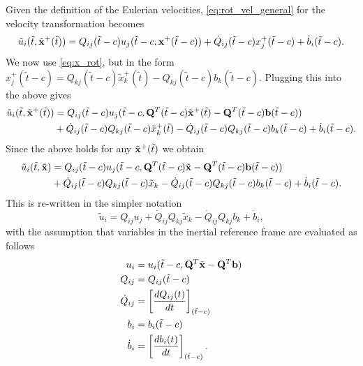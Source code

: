 \documentclass[oneside,a4paper,11pt]{report}
\begin{document}
Given the definition of the Eulerian velocities, \cref{eq:rot_vel_general} for the velocity transformation becomes
\begin{equation}
     \tilde{u}_i(\tilde{t}, \tilde{\mathbf{x}}^+(\tilde{t})) = Q_{ij}(\tilde{t} - c) u_j(\tilde{t} - c,\mathbf{x}^+(\tilde{t}-c)) + \dot{Q}_{ij}(\tilde{t} - c) x^+_j(\tilde{t} - c) + \dot{b}_i(\tilde{t} - c).
\end{equation}
We now use \cref{eq:x_rot}, but in the form $x_j^+(\tilde{t} - c) = Q_{kj}(\tilde{t} - c) \tilde{x}_k^+(\tilde{t}) - Q_{kj}(\tilde{t} - c) b_k(\tilde{t}-c)$. Plugging this into the above gives
\begin{align}
\tilde{u}_i(\tilde{t},\tilde{\mathbf{x}}^+(\tilde{t})) &= Q_{ij}(\tilde{t} - c) u_j(\tilde{t} - c,\bold{Q}^T(\tilde{t} - c)\tilde{\mathbf{x}}^+(\tilde{t}) - \bold{Q}^T(\tilde{t} - c) \mathbf{b}(\tilde{t}-c)) \nonumber \\
& + \dot{Q}_{ij}(\tilde{t} - c) Q_{kj}(\tilde{t} -c) \tilde{x}_k^+(\tilde{t}) - \dot{Q}_{ij}(\tilde{t} - c) Q_{kj}(\tilde{t} - c) b_k(\tilde{t} - c) + \dot{b}_i(\tilde{t} - c).
\end{align}
Since the above holds for any $\tilde{\mathbf{x}}^+(\tilde{t})$ we obtain
\begin{align}
\tilde{u}_i(\tilde{t},\tilde{\mathbf{x}}) &= Q_{ij}(\tilde{t} - c) u_j(\tilde{t} - c,\bold{Q}^T(\tilde{t} - c)\tilde{\mathbf{x}} - \bold{Q}^T(\tilde{t} - c) \mathbf{b}(\tilde{t}-c)) \nonumber \\
& + \dot{Q}_{ij}(\tilde{t} - c) Q_{kj}(\tilde{t} -c) \tilde{x}_k - \dot{Q}_{ij}(\tilde{t} - c) Q_{kj}(\tilde{t} - c) b_k(\tilde{t} - c) + \dot{b}_i(\tilde{t} - c).
\end{align}
This is re-written in the simpler notation
\begin{equation}
\label{eq:rot_vel_eulerian}
\tilde{u}_i = Q_{ij}u_j + \dot{Q}_{ij} Q_{kj} \tilde{x}_k - \dot{Q}_{ij}Q_{kj}b_k + \dot{b}_i,
\end{equation}
with the assumption that variables in the inertial reference frame are evaluated as follows
\begin{align}
    u_i &= u_i(\tilde{t} - c,\bold{Q}^T\tilde{\mathbf{x}} - \bold{Q}^T \mathbf{b}) \nonumber \\ 
    Q_{ij} & = Q_{ij}(\tilde{t} - c) \nonumber \\
    \dot{Q}_{ij} &= \left [ \frac{dQ_{ij}(t)}{dt} \right ]_{(\tilde{t} - c)} \nonumber \\
    b_i &= b_i(\tilde{t} - c) \nonumber \\
    \dot{b}_i &= \left [ \frac{db_i(t)}{dt} \right ]_{(\tilde{t} - c)}.
\end{align}
\end{document}
